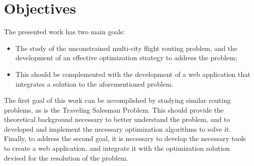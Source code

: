 \section{Objectives}




The presented work has two main goals:
\begin{itemize}
    \item The study of the unconstrained multi-city flight routing problem, and the development of an effective optimization strategy to address the problem;
    \item This should be complemented with the development of a web application that integrates a solution to the aforementioned problem.
\end{itemize}

The first goal of this work can be accomplished by studying similar routing problems, as is the Traveling Salesman Problem. This should provide the theoretical background necessary to better understand the problem, and to developed and implement the necessary optimization algorithms to solve it. Finally, to address the second goal, it is necessary to develop the necessary tools to create a web application, and integrate it with the optimization solution devised for the resolution of the problem.


















